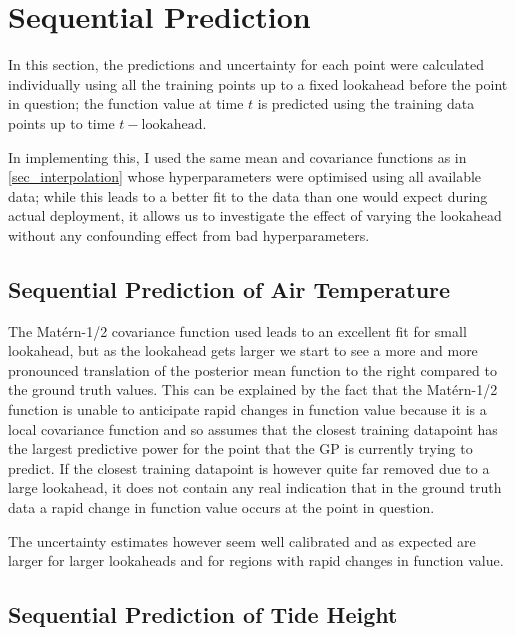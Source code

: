 \documentclass{article}
\begin{document}
    \section{Sequential Prediction}
            
            In this section, the predictions and uncertainty for each point were calculated individually using all the training points up to a fixed lookahead before the point in question; the function value at time $t$ is predicted using the training data points up to time $t-\textrm{lookahead}$.

            In implementing this, I used the same mean and covariance functions as in \cref{sec_interpolation} whose hyperparameters were optimised using all available data; while this leads to a better fit to the data than one would expect during actual deployment, it allows us to investigate the effect of varying the lookahead without any confounding effect from bad hyperparameters.

            \subsection{Sequential Prediction of Air Temperature} 

                The Matérn-1/2 covariance function used leads to an excellent fit for small lookahead, but as the lookahead gets larger we start to see a more and more pronounced translation of the posterior mean function to the right compared to the ground truth values. This can be explained by the fact that the Matérn-1/2 function is unable to anticipate rapid changes in function value because it is a local covariance function and so assumes that the closest training datapoint has the largest predictive power for the point that the GP is currently trying to predict. If the closest training datapoint is however quite far removed due to a large lookahead, it does not contain any real indication that in the ground truth data a rapid change in function value occurs at the point in question.

                The uncertainty estimates however seem well calibrated and as expected are larger for larger lookaheads and for regions with rapid changes in function value.

            \subsection{Sequential Prediction of Tide Height}
\end{document}
